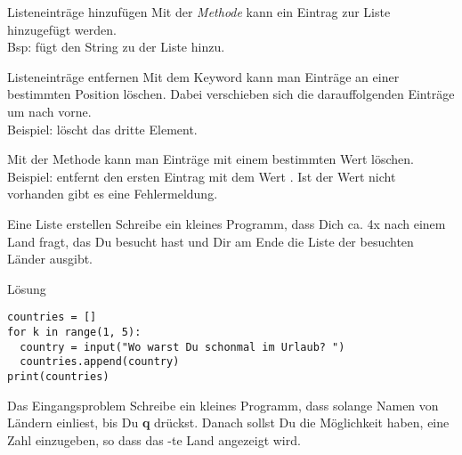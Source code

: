 \begin{frame}
\begin{block}{Listeneinträge hinzufügen}
	\vspace{2pt}
	Mit der \emph{Methode}  kann ein Eintrag zur Liste hinzugefügt werden. \\ 
	Bsp:  fügt den String  zu der Liste hinzu. 
\end{block}	

\pause 
\vspace{12pt}


\begin{block}{Listeneinträge entfernen}
	\pause 
\vspace{2pt}
Mit dem Keyword  kann man Einträge an einer bestimmten Position löschen. Dabei verschieben sich die darauffolgenden Einträge um  nach vorne. \\
Beispiel:  löscht das dritte Element.  

\pause 

Mit der Methode  kann man Einträge mit einem bestimmten Wert löschen. \\
Beispiel:  entfernt den ersten Eintrag mit dem Wert . Ist der Wert nicht vorhanden gibt es eine Fehlermeldung. 
\end{block}
\end{frame}

\begin{fragile}[Übung]
\begin{block}{Eine Liste erstellen}
\vspace{2pt}
Schreibe ein kleines Programm, dass Dich ca. 4x nach einem Land fragt, das Du besucht hast und Dir am Ende die Liste der besuchten Länder ausgibt. 	
\end{block}
\vspace{12pt}
\begin{solutionblock}{Lösung}
\begin{verbatim}
countries = []
for k in range(1, 5):
  country = input("Wo warst Du schonmal im Urlaub? ")
  countries.append(country)
print(countries)
\end{verbatim}
\end{solutionblock}
\end{fragile}





\begin{fragile}[Übung]
\begin{block}{Das Eingangsproblem}
\vspace{2pt}
Schreibe ein kleines Programm, dass solange Namen von Ländern einliest, bis Du \textbf{q} drückst. Danach sollst Du die Möglichkeit haben, eine Zahl  einzugeben, so dass das  -te Land angezeigt wird. 
\end{block}	
\end{fragile}

